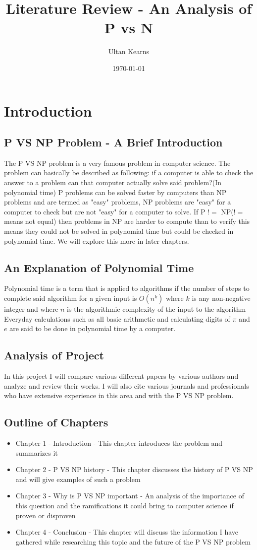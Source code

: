 \documentclass{report}
\title{Literature Review - An Analysis of P vs N}
\author{Ultan Kearns}
\date{\today}
\begin{document}
\maketitle
\tableofcontents
\chapter{Introduction}
\section{P VS NP Problem - A Brief Introduction}
The P VS NP problem is a very famous problem in computer science.  The problem
can basically be described as following: if a computer is able to check the answer
to a problem can that computer actually solve said problem?(In polynomial time)\cite{pvsnpmit}  P problems can be
solved faster by computers than NP problems and are termed as "easy" problems, NP problems
are "easy" for a computer to check but are not "easy" for a computer to solve.\cite{pvsnpmit}
If P $!=$ NP($!=$ means not equal) then problems in NP are harder to compute than to verify
this means they could not be solved in polynomial time but could be checked in polynomial time.  We will explore this more in later chapters.
\section{An Explanation of Polynomial Time}
Polynomial time is a term that is applied to algorithms if the number of steps
to complete said algorithm for a given input is $O(n^k)$ where $k$ is any non-negative
integer and where $n$ is the algorithmic complexity of the input to the algorithm \cite{polynomial}
Everyday calculations such as all basic arithmetic and calculating digits of $\pi$ and $e$ are said
to be done in polynomial time by a computer\cite{polynomial}.
\section{Analysis of Project}
In this project I will compare various different papers by various authors and
analyze and review their works.  I will also cite various journals and professionals
who have extensive experience in this area and with the P VS NP problem.
\section{Outline of Chapters}
\begin{itemize}
  \item Chapter 1 - Introduction - This chapter introduces the problem and summarizes it
  \item  Chapter 2 - P VS NP history - This chapter discusses the history of P VS NP and will give examples of such a problem
  \item Chapter 3 - Why is P VS NP important - An analysis of the importance of this question and the ramifications it could bring to computer science if proven or disproven
  \item Chapter 4 - Conclusion - This chapter will discuss the information I have gathered while researching this topic and the future of the P VS NP problem
\end{itemize}
\end{document}
